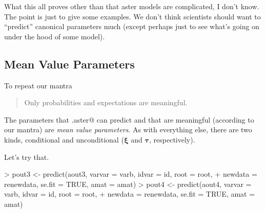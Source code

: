 \documentclass[11pt]{article}
\newcommand{\boldxi}{{\boldsymbol{\xi}}}
\newcommand{\boldtau}{{\boldsymbol{\tau}}}
\begin{document}
What this all proves other than that aster models are complicated, I don't
know.  The point is just to give some examples.  We don't think scientists
should want to ``predict'' canonical parameters much (except perhaps just
to see what's going on under the hood of some model).

\subsection{Mean Value Parameters}

To repeat our mantra
\begin{quote}
Only probabilities and expectations are meaningful.
\end{quote}
The parameters that \verb@predict.aster@ can predict and that are meaningful
(according to our mantra) are \emph{mean value parameters}.  As with everything
else, there are two kinds, conditional and unconditional
($\boldxi$ and $\boldtau$, respectively).

Let's try that.
\begin{Schunk}
\begin{Sinput}
> pout3 <- predict(aout3, varvar = varb, idvar = id, root = root, 
+     newdata = renewdata, se.fit = TRUE, amat = amat)
> pout4 <- predict(aout4, varvar = varb, idvar = id, root = root, 
+     newdata = renewdata, se.fit = TRUE, amat = amat)
\end{Sinput}
\end{Schunk}
\end{document}
